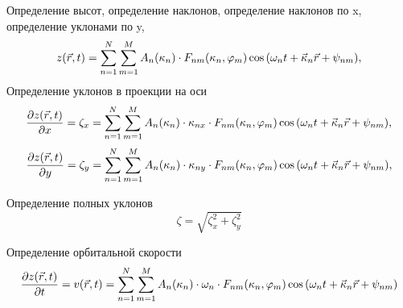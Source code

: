 \documentclass[10pt,pdf,hyperref={unicode}, dvipsnames]{beamer}
\renewcommand{\phi}{\varphi}
\begin{document}
\begin{frame}[t]{}
    Определение высот, определение наклонов, определение наклонов по x,
    определение уклонами по y,
    \begin{equation}
        z(\vec r,t) = \sum\limits_{n=1}^{N} \sum\limits_{m=1}^{M}
        A_n(\kappa_n) \cdot
        F_{nm}(\kappa_n,\phi_m) \cos \qty(\omega_n t + \vec \kappa_n \vec r + \psi_{nm}),
    \end{equation}
    Определение уклонов в проекции на оси
    \begin{equation}
        \pdv{z(\vec r,t)}{x} = \zeta_x = \sum\limits_{n=1}^{N} \sum\limits_{m=1}^{M}
        A_n(\kappa_n) \cdot \kappa_{nx} \cdot
        F_{nm}(\kappa_n,\phi_m) \cos \qty(\omega_n t + \vec \kappa_n \vec r + \psi_{nm}),
    \end{equation}
    \begin{equation}
        \pdv{z(\vec r,t)}{y} = \zeta_y = \sum\limits_{n=1}^{N} \sum\limits_{m=1}^{M}
        A_n(\kappa_n) \cdot \kappa_{ny} \cdot
        F_{nm}(\kappa_n,\phi_m) \cos \qty(\omega_n t + \vec \kappa_n \vec r + \psi_{nm}),
    \end{equation}

    Определение полных уклонов
    \begin{equation}
        \zeta = \sqrt{\zeta_x^2 + \zeta_y^2}
    \end{equation}

    Определение орбитальной скорости
    \begin{equation}
         \pdv{z(\vec r,t)}{t} = v(\vec r, t) = \sum\limits_{n=1}^{N} \sum\limits_{m=1}^{M}
        A_n(\kappa_n) \cdot \omega_{n} \cdot
        F_{nm}(\kappa_n,\phi_m) \cos \qty(\omega_n t + \vec \kappa_n \vec r + \psi_{nm})
    \end{equation}
    
\end{frame}
\end{document}
